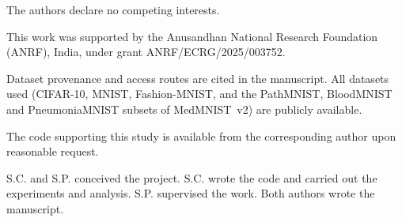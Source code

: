 \documentclass[pdflatex,sn-basic]{sn-jnl}
\begin{document}
\begin{description}\itemsep4pt
  \item[Competing interests.] The authors declare no competing interests.

  \item[Funding.] This work was supported by the Anusandhan National Research Foundation (ANRF), India, under grant ANRF/ECRG/2025/003752.

  \item[Data availability.] Dataset provenance and access routes are cited in the manuscript.
  All datasets used (CIFAR-10, MNIST, Fashion-MNIST, and the PathMNIST, BloodMNIST and PneumoniaMNIST subsets of MedMNIST~v2) are publicly available.

  \item[Code availability.] The code supporting this study is available from the corresponding author upon reasonable request.

  \item[Author contributions.]
  S.C. and S.P. conceived the project.
  S.C. wrote the code and carried out the experiments and analysis.
  S.P. supervised the work.
  Both authors wrote the manuscript.
\end{description}
\end{document}
